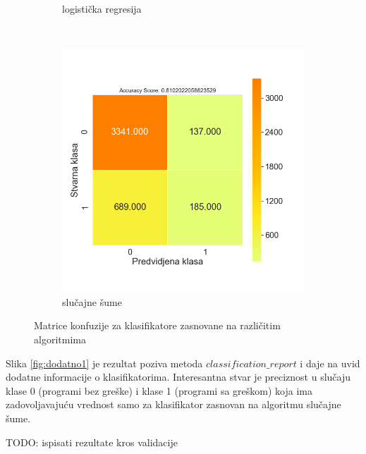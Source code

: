 \documentclass[12pt,oneside]{memoir}
\begin{document}
\begin{figure}[!h]
\begin{subfigure}[b]{0.45\textwidth}
        \caption{logistička regresija}
        \label{fig:logreg}
    \end{subfigure}
    \\
    \begin{subfigure}[b]{0.45\textwidth}
        \centering
        \includegraphics[width=\textwidth]{RF_basic_data_confussion_matrix}
        \caption{slučajne šume}
        \label{fig:randfor}
    \end{subfigure}
    \caption{Matrice konfuzije za klasifikatore zasnovane na različitim algoritmima}
    \label{fig:confmatr}
\end{figure}

Slika \ref{fig:dodatno1} je rezultat poziva metoda $classification\_report$ i daje na uvid dodatne informacije o klasifikatorima. Interesantna stvar je preciznost u slučaju klase 0 (programi bez greške) i klase 1 (programi sa greškom) koja ima zadovoljavajuću vrednost samo za klasifikator zasnovan na algoritmu slučajne šume. 

% 
TODO: ispisati rezultate kros validacije



\end{document}
